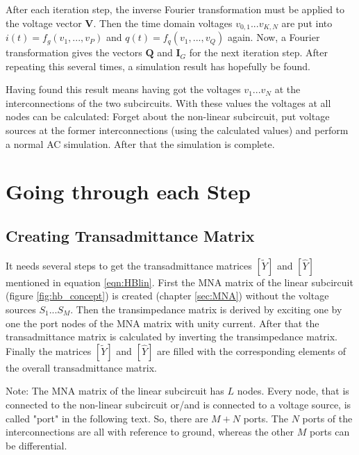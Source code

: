 \addvspace{12pt}

After each iteration step, the inverse Fourier transformation must
be applied to the voltage vector $\boldsymbol{V}$. Then the time domain
voltages $v_{0,1}...v_{K,N}$ are put into $i(t) = f_g(v_1, ..., v_P)$
and $q(t) = f_q(v_1, ..., v_Q)$ again. Now, a Fourier transformation
gives the vectors $\boldsymbol{Q}$ and $\boldsymbol{I}_G$ for the
next iteration step. After repeating this several times, a simulation
result has hopefully be found.

\addvspace{12pt}

Having found this result means having got the voltages $v_1...v_N$ at
the interconnections of the two subcircuits. With these values the
voltages at all nodes can be calculated: Forget about the non-linear
subcircuit, put voltage sources at the former interconnections (using
the calculated values) and perform a normal AC simulation. After that
the simulation is complete.

\section{Going through each Step}

\subsection{Creating Transadmittance Matrix}

It needs several steps to get the transadmittance matrices $[\tilde{Y}]$
and $[\hat{Y}]$ mentioned in equation \eqref{eqn:HBlin}. First the MNA
matrix of the linear subcircuit (figure \ref{fig:hb_concept}) is created
(chapter \ref{sec:MNA}) without the voltage sources $S_1$...$S_M$. Then
the transimpedance matrix is derived by
exciting one by one the port nodes of the MNA matrix with unity current.
After that the transadmittance matrix is calculated by inverting the
transimpedance matrix. Finally the matrices $[\tilde{Y}]$ and $[\hat{Y}]$
are filled with the corresponding elements of the overall transadmittance
matrix.

\addvspace{12pt}

Note: The MNA matrix of the linear subcircuit has $L$ nodes.
Every node, that is connected to the non-linear subcircuit or/and is
connected to a voltage source, is called "port" in the following text.
So, there are $M+N$ ports. The $N$ ports of the interconnections are
all with reference to ground, whereas the other $M$ ports can be
differential.

